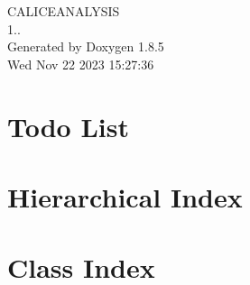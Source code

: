 \documentclass[twoside]{book}
\newcommand{\clearemptydoublepage}{%
  \newpage{\pagestyle{empty}\cleardoublepage}%
}
\begin{document}
\begin{titlepage}
\vspace*{7cm}
\begin{center}%
{\Large C\-A\-L\-I\-C\-E\-A\-N\-A\-L\-Y\-S\-I\-S \\[1ex]\large 1.. }\\
\vspace*{1cm}
{\large Generated by Doxygen 1.8.5}\\
\vspace*{0.5cm}
{\small Wed Nov 22 2023 15:27:36}\\
\end{center}
\end{titlepage}
\clearemptydoublepage
\tableofcontents
\clearemptydoublepage
{}

\chapter{Todo List}
\label{todo}

\chapter{Hierarchical Index}

\chapter{Class Index}

\end{document}
